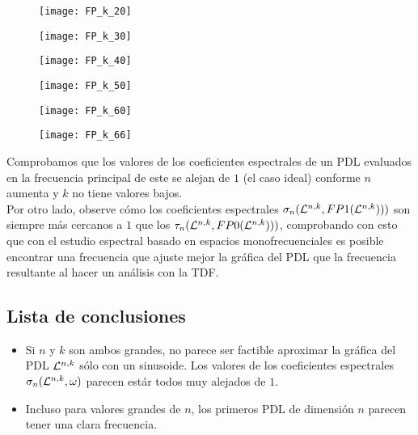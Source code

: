 \begin{figure}[H]
	\centering
	\texttt{[image: FP\_k\_20]} 
\end{figure}	

\begin{figure}[H]
	\centering
	\texttt{[image: FP\_k\_30]} 
\end{figure}	

\begin{figure}[H]
	\centering
	\texttt{[image: FP\_k\_40]} 
\end{figure}	

\begin{figure}[H]
	\centering
	\texttt{[image: FP\_k\_50]} 
\end{figure}	

\begin{figure}[H]
	\centering
	\texttt{[image: FP\_k\_60]} 
\end{figure}	

\begin{figure}[H]
	\centering
	\texttt{[image: FP\_k\_66]} 
\end{figure}	


Comprobamos que los valores de los
coeficientes espectrales de un PDL
evaluados en la frecuencia principal de este 
se alejan de $1$ (el caso ideal)
conforme $n$ aumenta y $k$ no tiene valores bajos. \\

Por otro lado, 
observe cómo los coeficientes espectrales 
$\sigma_{n}(\mathcal{L}^{n,k}, FP1(\mathcal{L}^{n,k})))$ son 
siempre más cercanos a $1$
que los 
$\tau_{n}(\mathcal{L}^{n,k}, FP0(\mathcal{L}^{n,k})))$, 
comprobando con esto que con el estudio
espectral basado en espacios monofrecuenciales
es posible encontrar una frecuencia que ajuste mejor la
gráfica del PDL que la frecuencia resultante
al hacer un análisis con la TDF.

\subsection{Lista de conclusiones}
\begin{itemize}
\item Si $n$ y $k$ son ambos grandes, 
no parece ser factible aproximar la gráfica
del PDL $\mathcal{L}^{n,k}$ sólo con un sinusoide. Los valores
de los coeficientes espectrales $\sigma_{n}(\mathcal{L}^{n,k}, \omega)$
parecen estár todos muy alejados de $1$.
\item Incluso para valores grandes de $n$, los primeros
PDL de dimensión $n$ parecen tener una clara frecuencia.
\end{itemize}